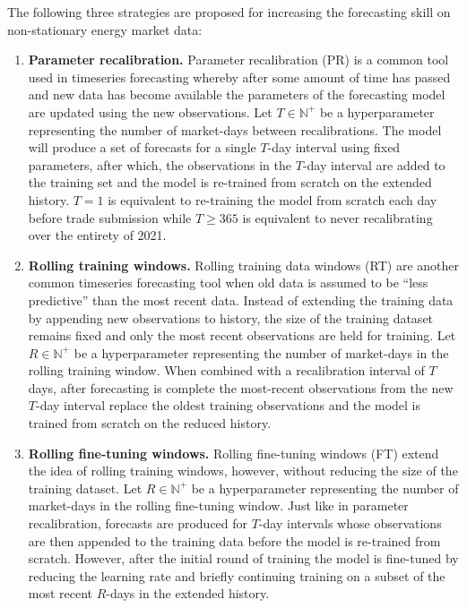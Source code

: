 The following three strategies are proposed for increasing the forecasting skill on non-stationary energy
market data:
\begin{enumerate}
    \item \textbf{Parameter recalibration.} Parameter recalibration (PR) is a common tool used in timeseries
    forecasting whereby after some amount of time has passed and new data
    has become available the parameters of the forecasting model are updated
    using the new observations.
    Let $T \in \mathbb{N}^+$ be a hyperparameter representing the number of
    market-days between recalibrations.
    The model will produce a set of forecasts for a single $T$-day interval
    using fixed parameters, after which, the observations in the $T$-day
    interval are added to the training set and the model is re-trained from
    scratch on the extended history.
    $T=1$ is equivalent to re-training the model from scratch each day before
    trade submission while $T \geq 365$ is equivalent to never recalibrating
    over the entirety of 2021.
    \item \textbf{Rolling training windows.} Rolling training data windows (RT) are another common timeseries
    forecasting tool when old data is assumed to be ``less predictive'' than
    the most recent data.
    Instead of extending the training data by appending new observations to
    history, the size of the training dataset remains fixed and only the most
    recent observations are held for training.
    Let $R \in \mathbb{N}^+$ be a hyperparameter representing the number of
    market-days in the rolling training window.
    When combined with a recalibration interval of $T$ days, after forecasting
    is complete the most-recent observations from the new $T$-day interval
    replace the oldest training observations and the model is trained from
    scratch on the reduced history.
    \item \textbf{Rolling fine-tuning windows.} Rolling fine-tuning windows (FT) extend the idea of rolling training
    windows, however, without reducing the size of the training dataset.
    Let $R \in \mathbb{N}^+$ be a hyperparameter representing the number of
    market-days in the rolling fine-tuning window.
    Just like in parameter recalibration, forecasts are produced for
    $T$-day intervals whose observations are then appended to the training
    data before the model is re-trained from scratch.
    However, after the initial round of training the model is fine-tuned by
    reducing the learning rate and briefly continuing training on a subset
    of the most recent $R$-days in the extended history.
\end{enumerate}

